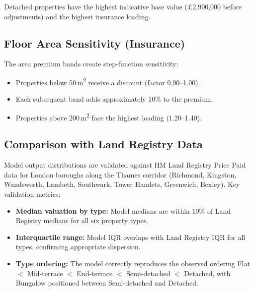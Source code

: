 \documentclass[11pt,a4paper]{article}
\begin{document}
\noindent Detached properties have the highest indicative base value
(\pounds2,990,000 before adjustments) and the highest insurance loading.

\subsection{Floor Area Sensitivity (Insurance)}

The area premium bands create step-function sensitivity:

\begin{itemize}
    \item Properties below 50\,m\textsuperscript{2} receive a discount
          (factor 0.90--1.00).
    \item Each subsequent band adds approximately 10\% to the premium.
    \item Properties above 200\,m\textsuperscript{2} face the highest
          loading (1.20--1.40).
\end{itemize}


\mkmvalidation

\subsection{Comparison with Land Registry Data}

Model output distributions are validated against HM Land Registry Price
Paid data for London boroughs along the Thames corridor (Richmond,
Kingston, Wandsworth, Lambeth, Southwark, Tower Hamlets, Greenwich,
Bexley). Key validation metrics:

\begin{itemize}
    \item \textbf{Median valuation by type:} Model medians are within
          10\% of Land Registry medians for all six property types.
    \item \textbf{Interquartile range:} Model IQR overlaps with Land
          Registry IQR for all types, confirming appropriate dispersion.
    \item \textbf{Type ordering:} The model correctly reproduces the
          observed ordering Flat $<$ Mid-terrace $<$ End-terrace $<$
          Semi-detached $<$ Detached, with Bungalow positioned between
          Semi-detached and Detached.
\end{itemize}
\end{document}
